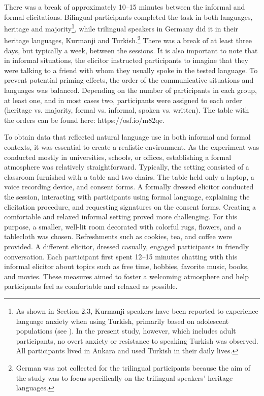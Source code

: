 There was a break of approximately 10--15 minutes between the informal and formal elicitations. Bilingual participants completed the task in both languages, heritage and majority\footnote{As shown in Section 2.3, Kurmanji speakers have been reported to experience language anxiety when using Turkish, primarily based on adolescent populations (see \citealt{Sahin-firat2010}). In the present study, however, which includes adult participants, no overt anxiety or resistance to speaking Turkish was observed. All participants lived in Ankara and used Turkish in their daily lives.}, while trilingual speakers in Germany did it in their heritage languages, Kurmanji and Turkish.\footnote{German was not collected for the trilingual participants because the aim of the study was to focus specifically on the trilingual speakers’ heritage languages.} There was a break of at least three days, but typically a week, between the sessions. It is also important to note that in informal situations, the elicitor instructed participants to imagine that they were talking to a friend with whom they usually spoke in the tested language. To prevent potential priming effects, the order of the communicative situations and languages was balanced. Depending on the number of participants in each group, at least one, and in most cases two, participants were assigned to each order (heritage vs. majority, formal vs. informal, spoken vs. written). The table with the orders can be found here: https://osf.io/m82qe.

To obtain data that reflected natural language use in both informal and formal contexts, it was essential to create a realistic environment. As the experiment was conducted mostly in universities, schools, or offices, establishing a formal atmosphere was relatively straightforward. Typically, the setting consisted of a classroom furnished with a table and two chairs. The table held only a laptop, a voice recording device, and consent forms. A formally dressed elicitor conducted the session, interacting with participants using formal language, explaining the elicitation procedure, and requesting signatures on the consent forms. Creating a comfortable and relaxed informal setting proved more challenging. For this purpose, a smaller, well-lit room decorated with colorful rugs, flowers, and a tablecloth was chosen. Refreshments such as cookies, tea, and coffee were provided. A different elicitor, dressed casually, engaged participants in friendly conversation. Each participant first spent 12--15 minutes chatting with this informal elicitor about topics such as free time, hobbies, favorite music, books, and movies. These measures aimed to foster a welcoming atmosphere and help participants feel as comfortable and relaxed as possible.

